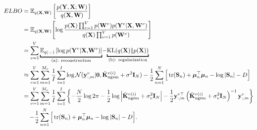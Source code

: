 \begin{equation}
    \begin{aligned}
            \MakeUppercase{elbo} & = \mathbb{E}_{q(\vx,\vw)} \left[ \frac{p(\vy, \vx ; \mathbf{W})}{q(\vx,\vw)}\right] \\
            & =  \mathbb{E}_{q(\vx, \vw)} \! \left[\log \frac{p(\vx) \prod_{v=1}^{V} p(\vw^v) p(\vy^v \vert \vx, \vw^v)}{q(\vx)\prod_{v=1}^{V} p(\vw^v)} \right] \nonumber \\
            & = \sum_{v=1}^V \underbracket{\mathbb{E}_{q(\cdot, \cdot)} \left[ \log p(\vy^v \vert \vx,\!\vw^v) \right]}_{\text{(a): reconstruction}}\!-\!\underbracket{ \operatorname{KL}(q(\vx) \| p(\vx))}_{\text{(b): regularization}}\!\!\! \\
            & \approx \sum_{v=1}^V \sum_{m=1}^{M_v}   \frac{1}{{I}}\sum_{i=1}^{I} \log \mathcal{N}(\y_{:,m}^v \vert \bm{0}, \tilde{{\vk}}_{\mathrm{ngsm}}^{v(i)} + \sigma^2 \mathbf{I}_N) -  \frac{1}{2} \sum_{n=1}^{N} \Big[ \operatorname{tr}(\mathbf{S}_{n}) + \boldsymbol{\mu}_n^{\top} \boldsymbol{\mu}_n -\log |\mathbf{S}_{n}| - D  \Big] \\
            & = \sum_{v=1}^V \sum_{m=1}^{M_v} \frac{1}{{I}}\sum_{i=1}^{I}  \left\{ -\frac{N}{2} \log 2 \pi - \frac{1}{2} \log \left|    \tilde{{\vk}}_{\mathrm{ngsm}}^{v(i)} + \sigma_v^2 \mathbf{I}_N  \right| - \frac{1}{2} \y_{:, m}^{v\top}  \left(  \tilde{{\vk}}_{\mathrm{ngsm}}^{v(i)} + \sigma_v^2 \mathbf{I}_N \right)^{-1} \y_{:, m}^v \right\}  \! \\ 
            & ~~~ - \!  \frac{1}{2} \sum_{n=1}^{N} \Big[ \operatorname{tr}(\mathbf{S}_{n}) + \boldsymbol{\mu}_n^{\top} \boldsymbol{\mu}_n -\log |\mathbf{S}_{n}| - D  \Big].
    \end{aligned}
\end{equation}


